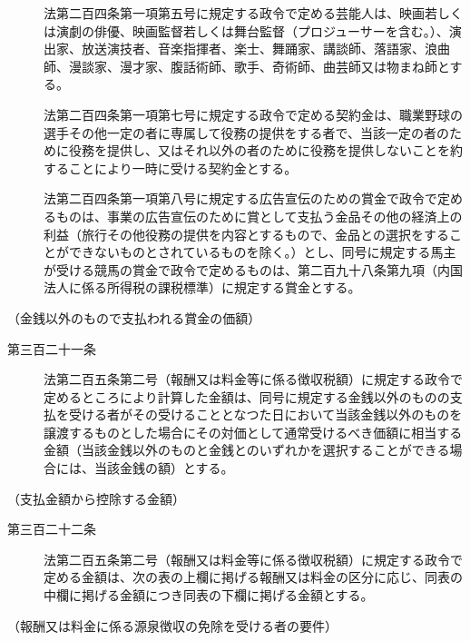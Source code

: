 \documentclass[twocolumn,a4j,10pt]{ltjtarticle}
\begin{document}
\begin{description}
\item[]法第二百四条第一項第五号に規定する政令で定める芸能人は、映画若しくは演劇の俳優、映画監督若しくは舞台監督（プロジューサーを含む。）、演出家、放送演技者、音楽指揮者、楽士、舞踊家、講談師、落語家、浪曲師、漫談家、漫才家、腹話術師、歌手、奇術師、曲芸師又は物まね師とする。
\item[]法第二百四条第一項第七号に規定する政令で定める契約金は、職業野球の選手その他一定の者に専属して役務の提供をする者で、当該一定の者のために役務を提供し、又はそれ以外の者のために役務を提供しないことを約することにより一時に受ける契約金とする。
\item[]法第二百四条第一項第八号に規定する広告宣伝のための賞金で政令で定めるものは、事業の広告宣伝のために賞として支払う金品その他の経済上の利益（旅行その他役務の提供を内容とするもので、金品との選択をすることができないものとされているものを除く。）とし、同号に規定する馬主が受ける競馬の賞金で政令で定めるものは、第二百九十八条第九項（内国法人に係る所得税の課税標準）に規定する賞金とする。
\end{description}
\noindent\hspace{10pt}（金銭以外のもので支払われる賞金の価額）
\begin{description}
\item[第三百二十一条]法第二百五条第二号（報酬又は料金等に係る徴収税額）に規定する政令で定めるところにより計算した金額は、同号に規定する金銭以外のものの支払を受ける者がその受けることとなつた日において当該金銭以外のものを譲渡するものとした場合にその対価として通常受けるべき価額に相当する金額（当該金銭以外のものと金銭とのいずれかを選択することができる場合には、当該金銭の額）とする。
\end{description}
\noindent\hspace{10pt}（支払金額から控除する金額）
\begin{description}
\item[第三百二十二条]法第二百五条第二号（報酬又は料金等に係る徴収税額）に規定する政令で定める金額は、次の表の上欄に掲げる報酬又は料金の区分に応じ、同表の中欄に掲げる金額につき同表の下欄に掲げる金額とする。
\end{description}
\noindent\hspace{10pt}（報酬又は料金に係る源泉徴収の免除を受ける者の要件）
\end{document}
